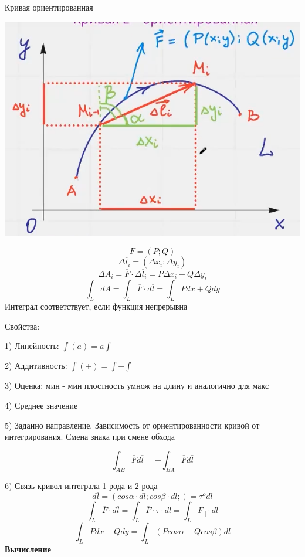 \documentclass{article}
\begin{document}
Кривая ориентированная
\begin{center}
    \includegraphics[width=.3\textwidth]{krivo2.png} 
\end{center}

\begin{equation*}
    \overline{F} = (P;Q)
\end{equation*}
\begin{equation*}
    \Delta \overline{l}_i = (\Delta x_i; \Delta y_i)
\end{equation*}
\begin{equation*}
    \Delta A_i = \overline{F}\cdot \Delta \overline{l}_i = P\Delta x_i+Q\Delta y_i
\end{equation*}
\begin{equation*}
    \int_{L}^{}dA = \int_{L}^{}\overline{F}\cdot d \overline{l} = \int_{L}^{}Pdx+Qdy
\end{equation*}
Интеграл соответствует, если функция непрерывна 


Свойства:

1) Линейность: $\int(a) = a\int$

2) Аддитивность: $\int(+) = \int+\int$

3) Оценка: мин - мин плостность умнож на длину и аналогично для макс 

4) Среднее значение

5) Заданно направление. Зависимость от ориентированности кривой от интегрирования. Смена знака при смене обхода

\begin{equation*}
    \int_{AB}^{}\overline{F}d\overline{l} = -\int_{BA}^{}\overline{F}d\overline{l}
\end{equation*}

6) Связь кривол интеграла 1 рода и 2 рода
\begin{equation*}
    d\overline{l} = (cos\alpha\cdot dl; cos\beta\cdot dl; )=\tau^o dl
\end{equation*}
\begin{equation*}
    \int_{L}^{}\overline{F}\cdot d\overline{l} = \int_{L}^{}\overline{F}\cdot \tau\cdot dl = \int_{L}^{}F_{||}\cdot dl
\end{equation*}
\begin{equation*}
    \int_{L}^{}Pdx+Qdy = \int_{L}^{}(Pcos\alpha + Q cos\beta)dl
\end{equation*}
\textbf{Вычисление}
\end{document}
